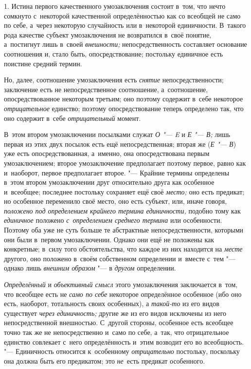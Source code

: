 1. Истина первого качественного умозаключения состоит в~том,
что нечто сомкнуто с~некоторой качественной определённостью как со всеобщей
не само по себе, а~через некоторую случайность или в~некоторой единичности.
В~такого рода качестве субъект умозаключения не возвратился в~своё понятие,
а~постигнут лишь в~своей {\em внешности;}
непосредственность составляет основание соотношения и, стало
быть, опосредствование; постольку единичное есть поистине средний термин.

Но, далее, соотношение умозаключения есть {\em снятие}
непосредственности; заключение есть не непосредственное
соотношение, а~соотношение, опосредствованное некоторым третьим; оно
поэтому содержит в~себе некоторое {\em отрицательное}
единство; поэтому опосредствование теперь определено так, что
оно содержит в~себе {\em отрицательный} момент.

В~этом втором умозаключении посылками служат {\em О "--- E} и {\em Е "--- В;}
лишь первая из этих двух посылок есть ещё непосредственная; вторая же
({\em Е "--- В}) уже есть опосредствованная, а~именно, она опосредствована
первым умозаключением; второе умозаключение предполагает поэтому первое,
равно как и~наоборот, первое предполагает второе. "--- Крайние
термины определены в~этом втором умозаключении друг относительно друга как
особенное и~всеобщее; последнее постольку сохраняет ещё своё {\em место;}
оно есть предикат; но особенное переменило своё место, оно есть субъект,
или, иначе говоря, {\em положено под определением
крайнего термина единичности,} подобно тому как
{\em единичное} положено {\em с~определением среднего термина}
или особенности. Поэтому оба уже не суть больше те
абстрактные непосредственности, которыми они были в~первом умозаключении.
Однако они ещё не положены как конкретные; в~силу того обстоятельства, что
каждое из них находится на {\em месте} другого, оно положено в~своём
собственном определении и~вместе с~тем "--- однако лишь
{\em внешним образом} "--- в {\em другом} определении.

{\em Определённый} и {\em объективный смысл}
этого умозаключения заключается в~том, что всеобщее есть не
{\em само по себе} некоторое определённое особенное (ибо оно есть, наоборот,
тотальность своих особенных), а {\em такой-то} из его видов существует
{\em через единичность;} другие же из его видов исключены из него
непосредственной внешностью. С~другой стороны, особенное есть всеобщее
точно так же не непосредственно и~само по себе, а~так, что отрицательное
единство совлекает с~него определённость и~этим возводит его во
всеобщность. "--- Единичность относится к~особенному {\em отрицательно}
постольку, поскольку она должна быть его предикатом; это
{\em не}~есть предикат особенного.

